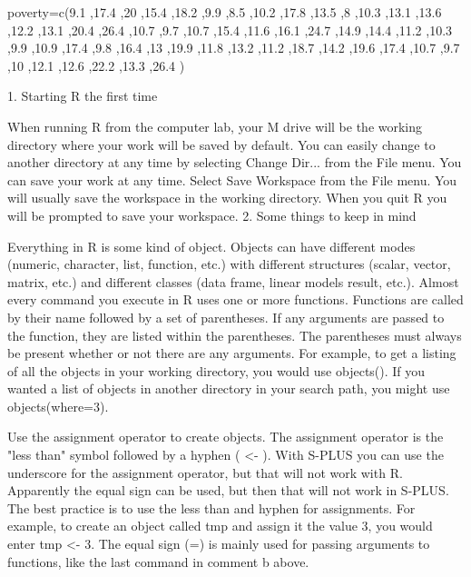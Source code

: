 \documentclass[a4paper,12pt]{article}
\begin{document}
poverty=c(9.1 ,17.4 ,20 ,15.4 ,18.2 ,9.9 ,8.5 ,10.2 ,17.8 ,13.5 ,8 ,10.3 ,13.1 ,13.6 ,12.2 ,13.1 ,20.4 ,26.4 ,10.7 ,9.7 ,10.7 ,15.4 ,11.6 ,16.1 ,24.7 ,14.9 ,14.4 ,11.2 ,10.3 ,9.9 ,10.9 ,17.4 ,9.8 ,16.4 ,13 ,19.9 ,11.8 ,13.2 ,11.2 ,18.7 ,14.2 ,19.6 ,17.4 ,10.7 ,9.7 ,10 ,12.1 ,12.6 ,22.2 ,13.3 ,26.4 )




\newpage




1. Starting R the first time


When running R from the computer lab, your M drive will be the working directory where your work will be saved by default. You can easily change to another directory at any time by selecting Change Dir... from the File menu. 
You can save your work at any time. Select Save Workspace from the File menu. You will usually save the workspace in the working directory. When you quit R you will be prompted to save your workspace. 
2. Some things to keep in mind


Everything in R is some kind of object. Objects can have different modes (numeric, character, list, function, etc.) with different structures (scalar, vector, matrix, etc.) and different classes (data frame, linear models result, etc.). 
Almost every command you execute in R uses one or more functions. Functions are called by their name followed by a set of parentheses. If any arguments are passed to the function, they are listed within the parentheses. The parentheses must always be present whether or not there are any arguments. For example, to get a listing of all the objects in your working directory, you would use objects(). If you wanted a list of objects in another directory in your search path, you might use objects(where=3). 

Use the assignment operator to create objects. The assignment operator is the "less than" symbol followed by a hyphen ( <- ). With S-PLUS you can use the underscore for the assignment operator, but that will not work with R. Apparently the equal sign can be used, but then that will not work in S-PLUS. The best practice is to use the less than and hyphen for assignments. For example, to create an object called tmp and assign it the value 3, you would enter tmp <- 3. The equal sign (=) is mainly used for passing arguments to functions, like the last command in comment b above. 
\end{document}
